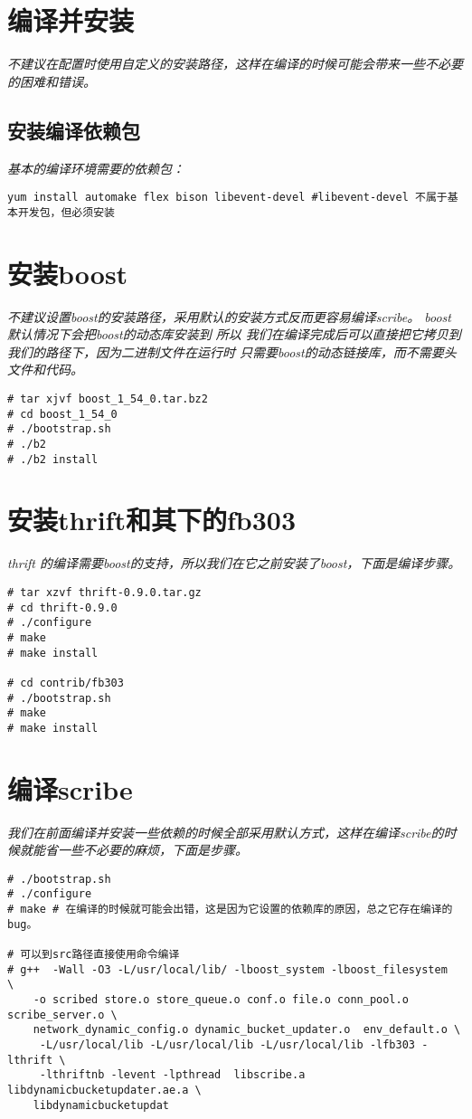\documentclass{article}
\begin{document}
\section{编译并安装}
\textit{
不建议在配置时使用自定义的安装路径，这样在编译的时候可能会带来一些不必要的困难和错误。
}

\subsection{安装编译依赖包}
\textit{
基本的编译环境需要的依赖包：
}

\begin{verbatim}
yum install automake flex bison libevent-devel #libevent-devel 不属于基本开发包，但必须安装
\end{verbatim}


\section{安装boost}
\textit{
不建议设置boost的安装路径，采用默认的安装方式反而更容易编译scribe。
boost 默认情况下会把boost的动态库安装到 所以
我们在编译完成后可以直接把它拷贝到我们的路径下，因为二进制文件在运行时
只需要boost的动态链接库，而不需要头文件和代码。
}

\begin{verbatim}
# tar xjvf boost_1_54_0.tar.bz2
# cd boost_1_54_0
# ./bootstrap.sh
# ./b2
# ./b2 install
\end{verbatim}

\section{安装thrift和其下的fb303}
\textit{
thrift 的编译需要boost的支持，所以我们在它之前安装了boost，下面是编译步骤。
}

\begin{verbatim}
# tar xzvf thrift-0.9.0.tar.gz
# cd thrift-0.9.0
# ./configure
# make
# make install

# cd contrib/fb303
# ./bootstrap.sh
# make
# make install
\end{verbatim}

\section{编译scribe}
\textit{
我们在前面编译并安装一些依赖的时候全部采用默认方式，这样在编译scribe的时候就能省一些不必要的麻烦，下面是步骤。
}

\begin{verbatim}
# ./bootstrap.sh
# ./configure
# make # 在编译的时候就可能会出错，这是因为它设置的依赖库的原因，总之它存在编译的bug。

# 可以到src路径直接使用命令编译
# g++  -Wall -O3 -L/usr/local/lib/ -lboost_system -lboost_filesystem  \
	-o scribed store.o store_queue.o conf.o file.o conn_pool.o scribe_server.o \
	network_dynamic_config.o dynamic_bucket_updater.o  env_default.o \
	 -L/usr/local/lib -L/usr/local/lib -L/usr/local/lib -lfb303 -lthrift \
	 -lthriftnb -levent -lpthread  libscribe.a libdynamicbucketupdater.ae.a \
	libdynamicbucketupdat
\end{verbatim}
\end{document}
